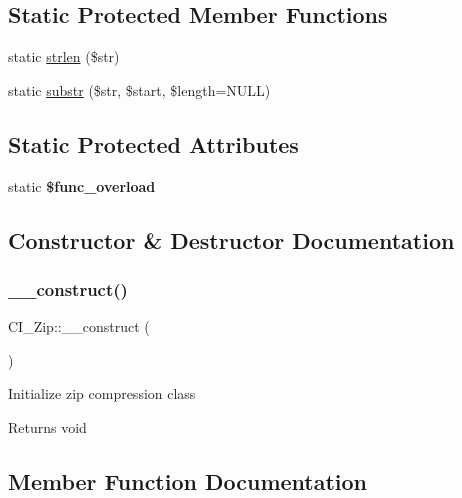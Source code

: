 \subsection*{Static Protected Member Functions}
\begin{DoxyCompactItemize}
\item 
static \mbox{\hyperlink{class_c_i___zip_a912580a36adf81345cfe4b48aa426b37}{strlen}} (\$str)
\item 
static \mbox{\hyperlink{class_c_i___zip_ac8366a931d5e4737b6a93ffb499b8e24}{substr}} (\$str, \$start, \$length=N\+U\+LL)
\end{DoxyCompactItemize}
\subsection*{Static Protected Attributes}
\begin{DoxyCompactItemize}
\item 
\mbox{\label{class_c_i___zip_a1e5e6bd3088583958f25a1ca083b6c5b}} 
static {\bfseries \$func\+\_\+overload}
\end{DoxyCompactItemize}


\subsection{Constructor \& Destructor Documentation}
\mbox{\label{class_c_i___zip_a5b39d7c382fd6be6a44005e091fb7abd}} 
\subsubsection{\texorpdfstring{\+\_\+\+\_\+construct()}{\_\_construct()}}
{\footnotesize\ttfamily C\+I\+\_\+\+Zip\+::\+\_\+\+\_\+construct (\begin{DoxyParamCaption}{ }\end{DoxyParamCaption})}

Initialize zip compression class

\begin{DoxyReturn}{Returns}
void 
\end{DoxyReturn}


\subsection{Member Function Documentation}
\mbox{\label{class_c_i___zip_a5f9aee83829fa88a567a475ad5d8039f}} 
